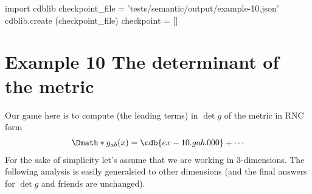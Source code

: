 \documentclass[12pt]{cdblatex}
\begin{document}
\bgroup
{}
\begin{cadabra}
   import cdblib
   checkpoint_file = 'tests/semantic/output/example-10.json'
   cdblib.create (checkpoint_file)
   checkpoint = []
\end{cadabra}
\egroup

\clearpage

\section*{Example 10 The determinant of the metric}

Our game here is to compute (the leading terms) in $\det g$ of the metric in RNC form
\begin{dgroup*}
   \Dmath*{g_{a b}(x) = \cdb{ex-10.gab.000}+\cdots}
\end{dgroup*}
For the sake of simplicity let's assume that we are working in 3-dimensions. The following
analysis is easily generalsied to other dimensions (and the final answers for $\det g$ and
friends are unchanged).
\end{document}
